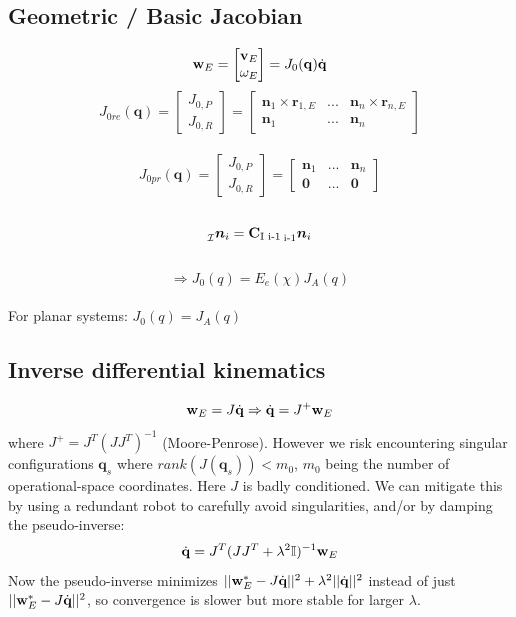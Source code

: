 \documentclass[a4paper, 8pt]{extarticle}
\newcommand{\mvec}[3]{  \prescript{}{\mathcal{#1}}{\bm{#2}}  _{#3} }
\newcommand{\mrot}[2]{ \textbf{#1}_{ \mathcal{#2} } }
\begin{document}
\begin{multicols*}{3}
\subsection{Geometric / Basic Jacobian}
$$\textbf{w}_E = \begin{bmatrix} \textbf v_E \\ \omega_E \end{bmatrix} = J_0(\mathbf q)\dot{\mathbf q}$$
$$J_{0 re}(\mathbf q) = \begin{bmatrix} 
J_{0,P} \\ J_{0,R} \end{bmatrix} = 
\begin{bmatrix}
\mathbf n_1 \times \mathbf r_{1,E} & ... & \mathbf n_n \times \mathbf r_{n,E} \\
\mathbf n_1 & ... & \mathbf n_n \end{bmatrix}$$\\
$$J_{0 pr}(\mathbf q) = \begin{bmatrix} 
J_{0,P} \\ J_{0,R} \end{bmatrix} = 
\begin{bmatrix}
\mathbf n_1  & ... & \mathbf n_n \\
\mathbf 0 & ... & \mathbf 0 \end{bmatrix}$$\\
$$\mvec{I}{n}{i}=\mrot{C}{\text{I i-1}} \mvec{\text{i-1}}{n}{i}$$\\
$$\Longrightarrow J_{0}(q)=E_{e}(\chi)J_{A}(q)$$\\
For planar systems: $J_{0}(q)=J_{A}(q)$\\



\subsection{Inverse differential kinematics}
$$\textbf{w}_E = J\dot{\mathbf q} \Rightarrow
\dot{\mathbf q} = J^+ \textbf w_E$$
where $J^+ = J^T(JJ^T)^{-1}$ (Moore-Penrose). However we risk encountering singular configurations $\mathbf q_s$ where $rank(J(\mathbf q_s)) < m_0$, $m_0$ being the number of operational-space coordinates. Here $J$ is badly conditioned. We can mitigate this by using a redundant robot to carefully avoid singularities, and/or by damping the pseudo-inverse:
$$\dot{\mathbf q} = J^T(JJ^T + \lambda^2\mathbb{I})^{-1} \textbf w_E$$
Now the pseudo-inverse minimizes $||\textbf w_E^* - J\dot{\textbf q}||^2 + \lambda^2||\dot{\mathbf q}||^2$ instead of just $||\textbf w_E^* - J\dot{\textbf q}||^2$, so convergence is slower but more stable for larger $\lambda$.\\


\end{multicols*}
\end{document}

